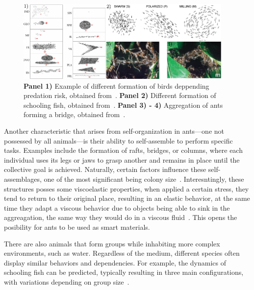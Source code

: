\begin{figure}
  \begin{center}
    \includegraphics[width=0.95\textwidth]{figures/macroscopicagents.pdf}
  \end{center}
  \caption[Macroscopic Agents example]{\textbf{Panel 1)} Example of different formation of birds deppending predation risk, obtained from~\cite{carere2009aerial}. \textbf{Panel 2)} Different formation of schooling fish, obtained from~\cite{tunstrom2013collective}. \textbf{Panel 3) - 4)} Aggregation of ants forming a bridge, obtained from~\cite{anderson2002self}.}\label{fig:macroscopicagents}
\end{figure}


Another characteristic that arises from self-organization in ants—one not possessed by all animals—is their ability to self-assemble to perform specific tasks. Examples include the formation of rafts, bridges, or columns, where each individual uses its legs or jaws to grasp another and remains in place until the collective goal is achieved. Naturally, certain factors influence these self-assemblages, one of the most significant being colony size~\cite{anderson2002self}. Interesntingly, these structures posses some viscoelastic properties, when applied a certain stress, they tend to return to their original place, resulting in an elastic behavior, at the same time they adapt a viscous behavior due to objects being able to sink in the aggreagation, the same way they would do in a viscous fluid~\cite{tennenbaum2016mechanics}. This opens the posibility for ants to be used as smart materials. 

There are also animals that form groups while inhabiting more complex environments, such as water. Regardless of the medium, different species often display similar behaviors and dependencies. For example, the dynamics of schooling fish can be predicted, typically resulting in three main configurations, with variations depending on group size~\cite{tunstrom2013collective, katz2011inferring, huang2024collective}.


